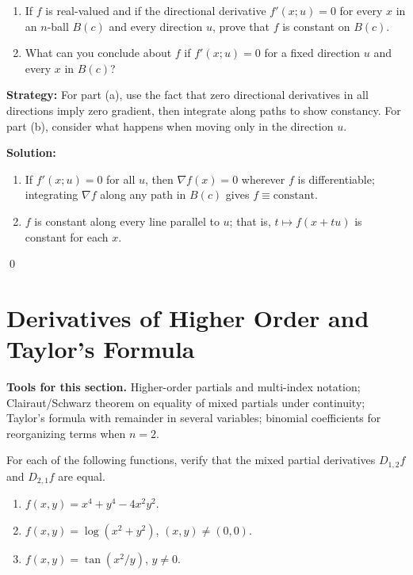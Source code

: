 \begin{problembox}
\begin{problemstatement}
\begin{enumerate}[label=(\alph*)]
\item If \( f \) is real-valued and if the directional derivative \( f'(x; u) = 0 \) for every \( x \) in an \( n \)-ball \( B(c) \) and every direction \( u \), prove that \( f \) is constant on \( B(c) \).
\item What can you conclude about \( f \) if \( f'(x; u) = 0 \) for a fixed direction \( u \) and every \( x \) in \( B(c) \)?
\end{enumerate}
\end{problemstatement}
\end{problembox}

\noindent\textbf{Strategy:} For part (a), use the fact that zero directional derivatives in all directions imply zero gradient, then integrate along paths to show constancy. For part (b), consider what happens when moving only in the direction \( u \).

\bigskip\noindent\textbf{Solution:}
\begin{enumerate}[label=(\alph*)]
\item If $f'(x;u)=0$ for all $u$, then $\nabla f(x)=0$ wherever $f$ is differentiable; integrating $\nabla f$ along any path in $B(c)$ gives $f\equiv\text{constant}$.
\item $f$ is constant along every line parallel to $u$; that is, $t\mapsto f(x+tu)$ is constant for each $x$.
\end{enumerate}\qed
\section{Derivatives of Higher Order and Taylor's Formula}

\noindent\textbf{Tools for this section.} Higher-order partials and multi-index notation; Clairaut/Schwarz theorem on equality of mixed partials under continuity; Taylor's formula with remainder in several variables; binomial coefficients for reorganizing terms when $n=2$.



\begin{problembox}
\begin{problemstatement}
For each of the following functions, verify that the mixed partial derivatives \( D_{1,2}f \) and \( D_{2,1}f \) are equal.
\begin{enumerate}[label=(\alph*)]
\item \( f(x, y) = x^4 + y^4 - 4x^2y^2 \).
\item \( f(x, y) = \log (x^2 + y^2) \), \( (x, y) \neq (0, 0) \).
\item \( f(x, y) = \tan (x^2/y) \), \( y \neq 0 \).
\end{enumerate}
\end{problemstatement}
\end{problembox}

